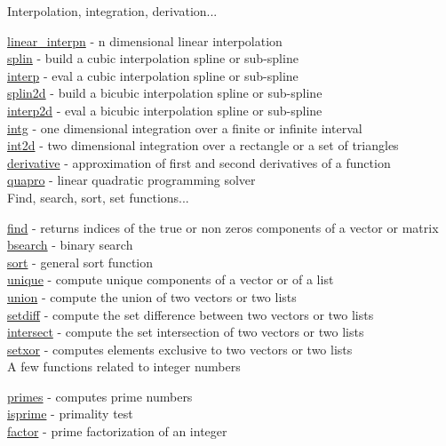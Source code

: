 Interpolation, integration, derivation...

\hyperlink{linear_interpn}{linear\_interpn} - n dimensional linear interpolation \\
\hyperlink{splin}{splin} - build a cubic interpolation spline or sub-spline \\
\hyperlink{interp}{interp} - eval a cubic interpolation spline or sub-spline \\
\hyperlink{splin2d}{splin2d} - build a bicubic interpolation spline or sub-spline \\
\hyperlink{interp2d}{interp2d} - eval a bicubic interpolation spline or sub-spline \\
\hyperlink{intg}{intg} - one dimensional integration over a finite or infinite interval \\
\hyperlink{int2d}{int2d} - two dimensional integration over a rectangle or a set of triangles \\
\hyperlink{derivative}{derivative} - approximation of first and second derivatives of a function\\
\hyperlink{quapro}{quapro} - linear quadratic programming solver \\

Find, search, sort, set functions...

\hyperlink{find}{find} - returns indices of the true or non zeros
components of a vector or matrix \\
\hyperlink{bsearch}{bsearch} - binary search \\
\hyperlink{sort}{sort} - general sort function \\
\hyperlink{unique}{unique} - compute unique components of a vector or of a list \\
\hyperlink{union}{union} - compute the union of two vectors or two lists \\
\hyperlink{setdiff}{setdiff} - compute the set difference between two vectors or two lists\\
\hyperlink{intersect}{intersect} - compute the set intersection of two vectors or two lists\\
\hyperlink{setxor}{setxor} - computes elements exclusive to two vectors or two lists\\


A few functions related to integer numbers

\hyperlink{primes}{primes} - computes prime numbers\\
\hyperlink{isprime}{isprime} - primality test\\
\hyperlink{factor}{factor} - prime factorization of an integer\\

